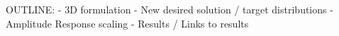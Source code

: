 OUTLINE:
  - 3D formulation
  - New desired solution / target distributions
  - Amplitude Response scaling
  - Results / Links to results
